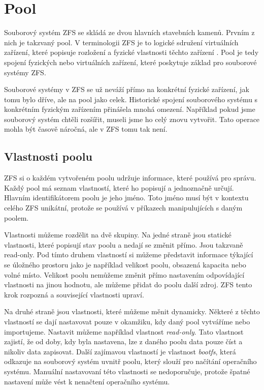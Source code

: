 \section{Pool}
Souborový systém ZFS se skládá ze dvou hlavních stavebních kamenů. Prvním z nich je takzvaný pool. V terminologii ZFS je to logické sdružení virtuálních zařízení, které popisuje rozložení a fyzické vlastnosti těchto zařízení \cite{terminology}. Pool je tedy spojení fyzických nebo virtuálních zařízení, které poskytuje základ pro souborové systémy ZFS.

Souborové systémy v ZFS se už neváží přímo na konkrétní fyzické zařízení, jak tomu bylo dříve, ale na pool jako celek. Historické spojení souborového systému s konkrétním fyzickým zařízením přinášela mnohá omezení. Například pokud jsme souborový systém chtěli rozšířit, museli jsme ho celý znovu vytvořit. Tato operace mohla být časově náročná, ale
v ZFS tomu tak není.
\subsection{Vlastnosti poolu}
ZFS si o každém vytvořeném poolu udržuje informace, které používá pro správu. Každý pool má seznam vlastností, které ho popisují a jednoznačně určují.
Hlavním identifikátorem poolu je jeho jméno. Toto jméno musí být v kontextu celého ZFS unikátní, protože se používá v příkazech manipulujících s daným poolem.

Vlastnosti můžeme rozdělit na dvě skupiny. Na jedné straně jsou statické vlastnosti, které popisují stav poolu a nedají se změnit přímo. Jsou takzvaně read-only. Pod tímto druhem vlastností si můžeme představit informace týkající se úložného prostoru jako je například velikost poolu, obsazená kapacita nebo volné místo. Velikost poolu nemůžeme změnit přímo nastavením odpovídající vlastnosti na jinou hodnotu, ale můžeme přidat do poolu další zdroj. ZFS tento krok rozpozná a související vlastnosti upraví.

Na druhé straně jsou vlastnosti, které můžeme měnit dynamicky. Některé z těchto vlastností se dají nastavovat pouze v okamžiku, kdy daný pool vytváříme nebo importujeme. Nastavit můžeme například vlastnost \emph{read-only}. Tato vlastnost zajistí, že od doby, kdy byla nastavena, lze z daného poolu data pouze číst a nikoliv data zapisovat. Další zajímavou vlastností je vlastnost \emph{bootfs}, která odkazuje na souborový systém uvnitř poolu, který slouží pro načítání operačního systému. Manuální nastavovaní této vlastnosti se nedoporučuje, protože špatné nastavení může vést k nenačtení operačního systému.

